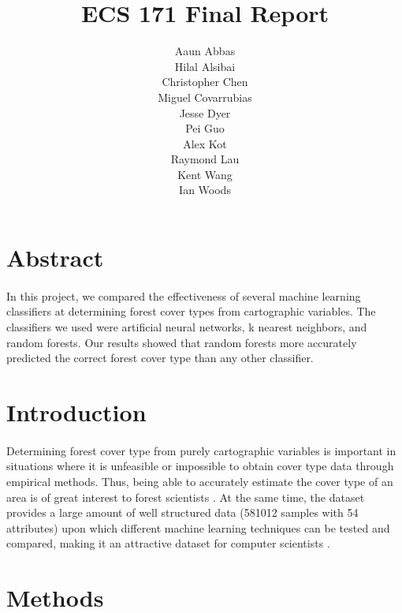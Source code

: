 \documentclass[11pt]{article}
\begin{document}
\begin{titlepage}
\title{\Huge ECS 171 Final Report}
\author{\huge Aaun Abbas\\\huge Hilal Alsibai\\\huge Christopher Chen\\\huge Miguel Covarrubias\\\huge Jesse Dyer\\\huge Pei Guo\\\huge Alex Kot\\\huge Raymond Lau\\\huge Kent Wang\\\huge Ian Woods}
\maketitle
\end{titlepage}
\section{Abstract}
\paragraph{}
In this project, we compared the effectiveness of several machine learning classifiers at determining forest cover types from cartographic variables. The classifiers we used were artificial neural networks, k nearest neighbors, and random forests. Our results showed that random forests more accurately predicted the correct forest cover type than any other classifier.
\section{Introduction}
\paragraph{}
Determining forest cover type from purely cartographic variables is important in situations where it is unfeasible or impossible to obtain cover type data through empirical methods. Thus, being able to accurately estimate the cover type of an area is of great interest to forest scientists \cite{blackard00}. At the same time, the dataset provides a large amount of well structured data (581012 samples with 54 attributes) upon which different machine learning techniques can be tested and compared, making it an attractive dataset for computer scientists \cite{gama03,oza01,giannella,furnkranz,obradovic,klami}.
\section{Methods}
\end{document}
